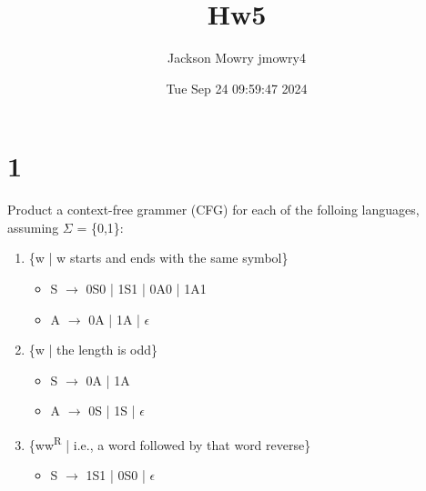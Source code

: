 \documentclass[11pt]{article}
\author{Jackson Mowry jmowry4}
\date{Tue Sep 24 09:59:47 2024}
\title{Hw5}
\begin{document}
\maketitle
\tableofcontents

\section{1}
\label{sec:org38cb567}
Product a context-free grammer (CFG) for each of the folloing languages, assuming \(\Sigma\) = \{0,1\}:
\begin{enumerate}
\item \{w | w starts and ends with the same symbol\}
\begin{itemize}
\item S \(\rightarrow\) 0S0 | 1S1 | 0A0 | 1A1
\item A \(\rightarrow\) 0A | 1A | \(\epsilon\)
\end{itemize}
\item \{w | the length is odd\}
\begin{itemize}
\item S \(\rightarrow\) 0A | 1A
\item A \(\rightarrow\) 0S | 1S | \(\epsilon\)
\end{itemize}
\item \{ww\textsuperscript{R} | i.e., a word followed by that word reverse\}
\begin{itemize}
\item S \(\rightarrow\) 1S1 | 0S0 | \(\epsilon\)
\end{itemize}
\end{enumerate}
\end{document}
